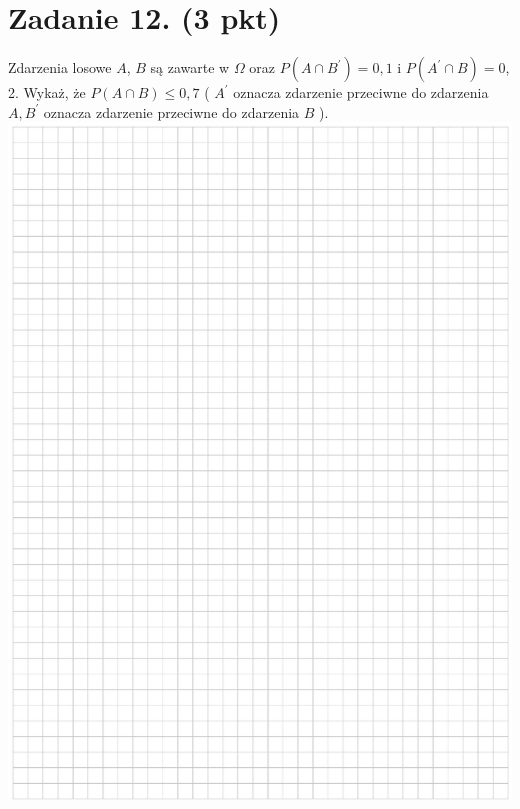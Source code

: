\documentclass[10pt]{article}
\begin{document}
\section*{Zadanie 12. (3 pkt)}
Zdarzenia losowe \(A\), \(B\) są zawarte w \(\Omega\) oraz \(P\left(A \cap B^{\prime}\right)=0,1\) i \(P\left(A^{\prime} \cap B\right)=0\), 2. Wykaż, że \(P(A \cap B) \leq 0,7\) ( \(A^{\prime}\) oznacza zdarzenie przeciwne do zdarzenia \(A, B^{\prime}\) oznacza zdarzenie przeciwne do zdarzenia \(B\) ).\\
\includegraphics[max width=\textwidth, center]{2024_11_21_d9af6ed2d610d3f2d2cbg-18}\\
\end{document}
